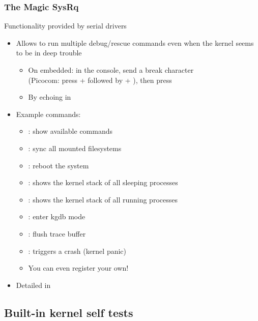 \begin{frame}[fragile]
  \frametitle{The Magic SysRq}
  Functionality provided by serial drivers
  \begin{itemize}
  \item Allows to run multiple debug/rescue commands even when the
    kernel seems to be in deep trouble
    \begin{itemize}
      \item On embedded: in the console, send a break character\\
        (Picocom: press \code{[Ctrl]} +  followed by \code{[Ctrl]}
        + \code{\ }), then press 
       \item By echoing  in 
    \end{itemize}
  \item Example commands:
    \begin{itemize}
    \item {}: show available commands
    \item {}: sync all mounted filesystems
    \item {}: reboot the system
    \item {}: shows the kernel stack of all sleeping processes
    \item {}: shows the kernel stack of all running processes
    \item {}: enter kgdb mode
    \item {}: flush trace buffer
    \item {}: triggers a crash (kernel panic)
    \item You can even register your own!
    \end{itemize}
  \item Detailed in 
  \end{itemize}
\end{frame}

\subsection{Built-in kernel self tests}

